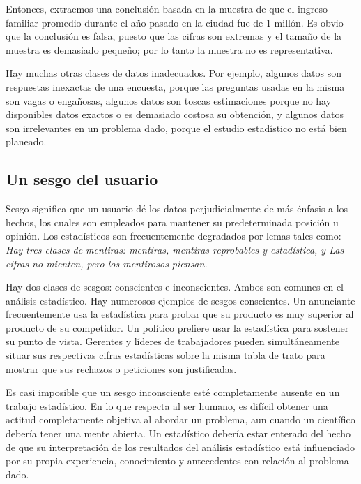 Entonces, extraemos una conclusi\'on basada en la muestra de que el ingreso familiar promedio durante el a\~no pasado en la ciudad fue de 1 mill\'on. Es obvio que la conclusi\'on es falsa, puesto que las cifras son extremas y el tama\~no de la muestra es demasiado peque\~no; por lo tanto la muestra no es representativa. 

Hay muchas otras clases de datos inadecuados. Por ejemplo, algunos datos son respuestas inexactas de una encuesta, porque las preguntas usadas en la misma son vagas o enga\~nosas, algunos datos son toscas estimaciones porque no hay disponibles datos exactos o es demasiado costosa su obtenci\'on, y algunos datos son irrelevantes en un problema dado, porque el estudio estad\'istico no est\'a bien planeado.

\subsection{Un sesgo del usuario}

Sesgo significa que un usuario d\'e los datos perjudicialmente de m\'as \'enfasis a los hechos, los cuales son empleados para mantener su predeterminada posici\'on u opini\'on. Los estad\'isticos son frecuentemente degradados por lemas tales como: \textit{Hay tres clases de mentiras: mentiras, mentiras reprobables y estad\'istica, y Las cifras no mienten, pero los mentirosos piensan.}

Hay dos clases de sesgos: conscientes e inconscientes. Ambos son comunes en el an\'alisis estad\'istico. Hay numerosos ejemplos de sesgos conscientes. Un anunciante frecuentemente usa la estad\'istica para probar que su producto es muy superior al producto de su competidor. Un pol\'itico prefiere usar la estad\'istica para sostener su punto de vista. Gerentes y l\'ideres de trabajadores pueden simult\'aneamente situar sus respectivas cifras estad\'isticas sobre la misma tabla de trato para mostrar que sus rechazos o peticiones son justificadas. 

Es casi imposible que un sesgo inconsciente est\'e completamente ausente en un trabajo estad\'istico. En lo que respecta al ser humano, es dif\'icil obtener una actitud completamente objetiva al abordar un problema, aun cuando un cient\'ifico deber\'ia tener una mente abierta. Un estad\'istico deber\'ia estar enterado del hecho de que su interpretaci\'on de los resultados del an\'alisis estad\'istico est\'a influenciado por su propia experiencia, conocimiento y antecedentes con relaci\'on al problema dado.

